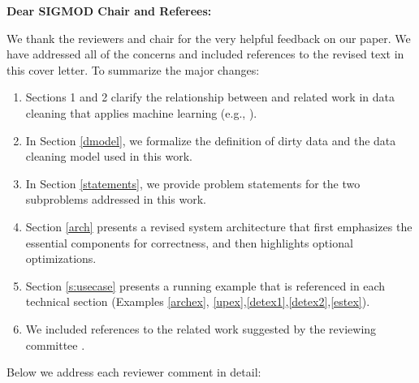 {\noindent \normalsize \bf Dear SIGMOD Chair and Referees: }

\vspace{.5em}

We thank the reviewers and chair for the very helpful feedback on our paper. 
We have addressed all of the concerns and included references to the revised text in this cover letter. 
To summarize the major changes:

\begin{enumerate}
\item Sections 1 and 2 clarify the relationship between \sys and related work in data cleaning that applies machine learning (e.g., \cite{gokhale2014corleone, DBLP:journals/pvldb/YakoutENOI11, yakout2013don}).

\item In Section \ref{dmodel}, we formalize the definition of dirty data and the data cleaning model used in this work.

\item In Section \ref{statements}, we provide problem statements for the two subproblems addressed in this work.

\item Section \ref{arch} presents a revised system architecture that first emphasizes the essential components for correctness, and then highlights optional optimizations. 

\item Section \ref{s:usecase} presents a running example that is referenced in each technical section (Examples \ref{archex}, \ref{upex},\ref{detex1},\ref{detex2},\ref{estex}).

\item We included references to the related work suggested by the reviewing committee \cite{whang2014incremental, papenbrock2015progressive, gruenheid2014incremental, DBLP:journals/pvldb/YakoutENOI11, yakout2013don, heise2014estimating}.

\end{enumerate}
Below we address each reviewer comment in detail:

\vspace{0.5em}

